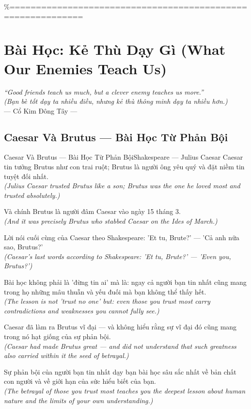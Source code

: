 \%============================================================
\chapter{Bài Học: Kẻ Thù Dạy Gì (What Our Enemies Teach Us)}
\begin{center}
  \textit{\color{truyengold}``Good friends teach us much, but a clever enemy teaches us more.''}\\[4pt]
  \textit{(Bạn bè tốt dạy ta nhiều điều, nhưng kẻ thù thông minh dạy ta nhiều hơn.)}\\[4pt]
  \small\color{truyenblue}--- Cổ Kim Đông Tây ---
\end{center}
\ngancach

\section{Caesar Và Brutus --- Bài Học Từ Phản Bội}
\begin{truyen}{Caesar Và Brutus --- Bài Học Từ Phản Bội}{Shakespeare --- Julius Caesar}
 Caesar tin tưởng Brutus như con trai ruột; Brutus là người ông yêu quý và đặt niềm tin tuyệt đối nhất.\\[4pt]
\textit{(Julius Caesar trusted Brutus like a son; Brutus was the one he loved most and trusted absolutely.)}

Và chính Brutus là người đâm Caesar vào ngày 15 tháng 3.\\[4pt]
\textit{(And it was precisely Brutus who stabbed Caesar on the Ides of March.)}

Lời nói cuối cùng của Caesar theo Shakespeare: 'Et tu, Brute?' --- 'Cả anh nữa sao, Brutus?'\\[4pt]
\textit{(Caesar's last words according to Shakespeare: 'Et tu, Brute?' --- 'Even you, Brutus?')}

Bài học không phải là 'đừng tin ai' mà là: ngay cả người bạn tin nhất cũng mang trong họ những mâu thuẫn và yếu đuối mà bạn không thể thấy hết.\\[4pt]
\textit{(The lesson is not 'trust no one' but: even those you trust most carry contradictions and weaknesses you cannot fully see.)}

Caesar đã làm ra Brutus vĩ đại --- và không hiểu rằng sự vĩ đại đó cũng mang trong nó hạt giống của sự phản bội.\\[4pt]
\textit{(Caesar had made Brutus great --- and did not understand that such greatness also carried within it the seed of betrayal.)}

\end{truyen}
\begin{baihoc}
  Sự phản bội của người bạn tin nhất dạy bạn bài học sâu sắc nhất về bản chất con người và về giới hạn của sức hiểu biết của bạn.\\[4pt]
  \textit{(The betrayal of those you trust most teaches you the deepest lesson about human nature and the limits of your own understanding.)}
\end{baihoc}


